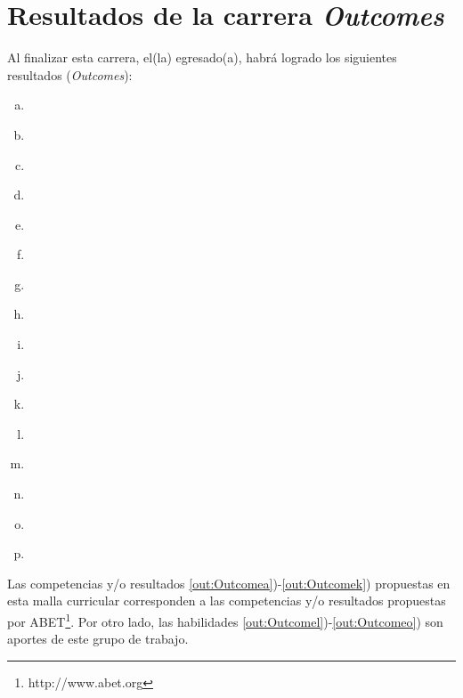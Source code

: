 \section{Resultados de la carrera {\it Outcomes}}\label{sec:outcomes}
Al finalizar esta carrera, el(la) egresado(a), habrá  logrado los siguientes resultados ({\it Outcomes}):

\begin{enumerate}[a)]
\item {}\label{out:Outcomea}
\item {}\label{out:Outcomeb}
\item {}\label{out:Outcomec}
\item {}\label{out:Outcomed}
\item {}\label{out:Outcomee}
\item {}\label{out:Outcomef}
\item {}\label{out:Outcomeg}
\item {}\label{out:Outcomeh}
\item {}\label{out:Outcomei}
\item {}\label{out:Outcomej}
\item {}\label{out:Outcomek}
\item {}\label{out:Outcomel}
\item {}\label{out:Outcomem}
\item {}\label{out:Outcomen}
\item {}\label{out:Outcomeñ}
\item {}\label{out:Outcomeo}
\end{enumerate}

Las competencias y/o resultados \ref{out:Outcomea})-\ref{out:Outcomek}) propuestas en esta malla curricular corresponden a las 
competencias y/o resultados propuestas por ABET\footnote{http://www.abet.org}.
Por otro lado, las habilidades \ref{out:Outcomel})-\ref{out:Outcomeo}) son aportes de este grupo de trabajo.